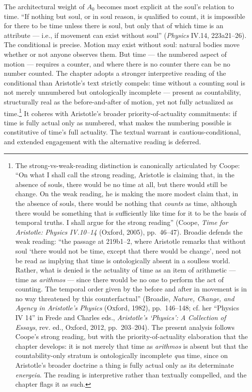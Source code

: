 \documentclass{article}
\begin{document}
The architectural weight of $A_0$ becomes most explicit at the soul's relation to time. ``If nothing but soul, or in soul reason, is qualified to count, it is impossible for there to be time unless there is soul, but only that of which time is an attribute --- i.e., if movement can exist without soul'' (\textit{Physics} IV.14, 223a21--26). The conditional is precise. Motion may exist without soul: natural bodies move whether or not anyone observes them. But time --- the numbered aspect of motion --- requires a counter, and where there is no counter there can be no number counted. The chapter adopts a stronger interpretive reading of the conditional than Aristotle's text strictly compels: time without a counting soul is not merely unnumbered but ontologically incomplete --- present as countability, structurally real as the before-and-after of motion, yet not fully actualized as time.\footnote{The strong-vs-weak-reading distinction is canonically articulated by Coope: ``On what I shall call the strong reading, Aristotle is claiming that, in the absence of souls, there would be no time at all, but there would still be change. On the weak reading, he is making the more modest claim that, in the absence of souls, there would be nothing that \textit{counts} as time, although there would be something that is sufficiently like time for it to be the basis of temporal truths. I shall argue for the strong reading'' (Coope, \textit{Time for Aristotle: Physics IV.10--14} (Oxford, 2005), pp.~46--47). Broadie defends the weak reading: ``the passage at 219b1--2, where Aristotle remarks that without soul `there would not be time, except that there would be change', need not be read as implying that time is ontologically absent in a soulless world. Rather, what is denied is the actuality of time as an item of arithmetic --- time as \textit{arithmos} --- since there would be no one to perform the act of counting. The temporal order given by the before and after in movement is in no way threatened by this counterfactual'' (Broadie, \textit{Nature, Change, and Agency in Aristotle's Physics} (Oxford, 1982), pp.~146--148; cf. her ``Physics IV 14'' in Frede and Charles eds., \textit{Aristotle's `Physics': A Collection of Essays}, rev. ed., Oxford, 2012, pp.~203--204). The present analysis follows Coope's strong reading, but with the priority-of-actuality elaboration that the chapter develops: it is not merely that time as \textit{arithmos} is absent but that the countability-only stratum is ontologically incomplete \textit{qua} time, since on Aristotle's broader doctrine a thing is fully actual only as its determinate \textit{energeia}. The reading is interpretive rather than textually compelled, and the chapter flags it as such.} It coheres with Aristotle's broader priority-of-actuality commitments: if time is fully actual only as numbered, what makes the numbering possible is constitutive of time's full actuality. The textual warrant is cautious-conditional, and extended engagement with the alternative reading is deferred.
\end{document}
